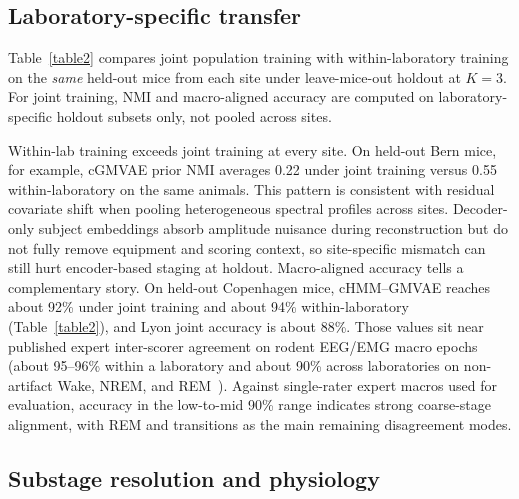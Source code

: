 \documentclass[10pt,letterpaper]{article}
\newcommand{\apdx}[1]{Appendix~\ref{#1}}
\newcommand{\papersubsection}[1]{\subsection{#1}}
\newcommand{\papersubsection}[1]{\subsection*{#1}}
\begin{document}
\papersubsection{Laboratory-specific transfer}

Table~\ref{table2} compares joint population training with within-laboratory training on the \emph{same} held-out mice from each site under leave-mice-out holdout at $K{=}3$.
For joint training, NMI and macro-aligned accuracy are computed on laboratory-specific holdout subsets only, not pooled across sites.

\begin{table}[!ht]
\centering
\caption{Fair per-laboratory holdout comparison (mean over four folds, $K{=}3$).
Joint training uses all laboratories but reports metrics on held-out mice from the listed site only.
Within training trains and evaluates inside the same site.
Deep models share locked per-laboratory preprocessing and matched hyperparameters (\apdx{app:methods:hyper}).
They differ in embedding use, sequence length ($T{=}1$ vs.\ $T{=}64$), and prior type.
HMM (raw) uses a time-domain pipeline without the shared spectral CNN front-end.
Best-of-three prior NMI and macro-aligned accuracy are averaged across folds.}

\label{table2}
\end{table}

Within-lab training exceeds joint training at every site. On held-out Bern mice, for example, cGMVAE prior NMI averages 0.22 under joint training versus 0.55 within-laboratory on the same animals.
This pattern is consistent with residual covariate shift when pooling heterogeneous spectral profiles across sites.
Decoder-only subject embeddings absorb amplitude nuisance during reconstruction but do not fully remove equipment and scoring context, so site-specific mismatch can still hurt encoder-based staging at holdout.
Macro-aligned accuracy tells a complementary story.
On held-out Copenhagen mice, cHMM--GMVAE reaches about 92\% under joint training and about 94\% within-laboratory (Table~\ref{table2}), and Lyon joint accuracy is about 88\%.
Those values sit near published expert inter-scorer agreement on rodent EEG/EMG macro epochs (about 95--96\% within a laboratory and about 90\% across laboratories on non-artifact Wake, NREM, and REM~\cite{miladinovic2019spindle}).
Against single-rater expert macros used for evaluation, accuracy in the low-to-mid 90\% range indicates strong coarse-stage alignment, with REM and transitions as the main remaining disagreement modes.

\papersubsection{Substage resolution and physiology}
\end{document}
